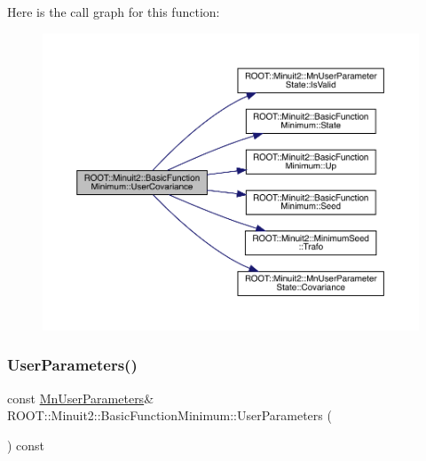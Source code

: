 Here is the call graph for this function\+:
\nopagebreak
\begin{figure}[H]
\begin{center}
\leavevmode
\includegraphics[width=350pt]{de/d25/classROOT_1_1Minuit2_1_1BasicFunctionMinimum_a4f06adfe70411becfe7aa48f6bce1f22_cgraph}
\end{center}
\end{figure}
\mbox{\label{classROOT_1_1Minuit2_1_1BasicFunctionMinimum_aa6fa4f1678939015849b6a2ab6023238}} 
\subsubsection{\texorpdfstring{UserParameters()}{UserParameters()}\hspace{0.1cm}{\footnotesize\ttfamily [1/3]}}
{\footnotesize\ttfamily const \mbox{\hyperlink{classROOT_1_1Minuit2_1_1MnUserParameters}{Mn\+User\+Parameters}}\& R\+O\+O\+T\+::\+Minuit2\+::\+Basic\+Function\+Minimum\+::\+User\+Parameters (\begin{DoxyParamCaption}{ }\end{DoxyParamCaption}) const\hspace{0.3cm}{\ttfamily [inline]}}


